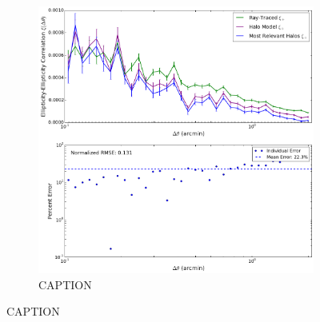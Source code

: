\documentclass[%
 reprint,
 amsmath,amssymb,
 aps,nofootinbib
]{revtex4-1}
\begin{document}
\begin{figure}
    \centering
    \begin{subfigure}{0.475\textwidth}
        \includegraphics[width=\textwidth]{figs-swe/thesis/rel_gg_compare.png}
        \captionsetup{justification=raggedright,singlelinecheck=false}
        \caption{CAPTION}

\end{subfigure}
\end{figure}
\end{document}
